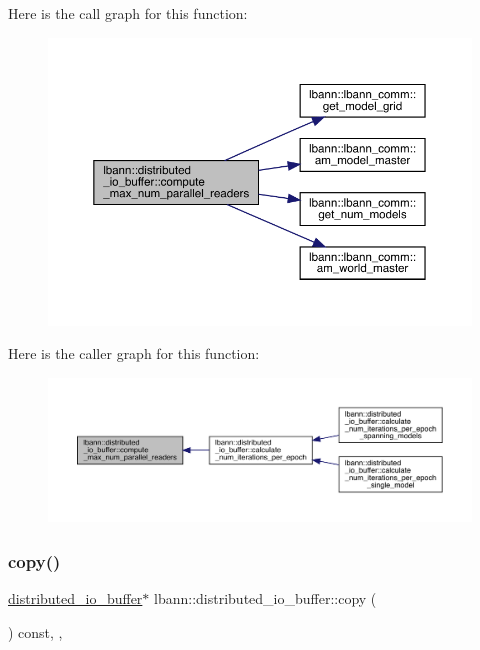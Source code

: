 Here is the call graph for this function\+:\nopagebreak
\begin{figure}[H]
\begin{center}
\leavevmode
\includegraphics[width=350pt]{classlbann_1_1distributed__io__buffer_af6653723714cf8cf51a928fc9f6e6728_cgraph}
\end{center}
\end{figure}
Here is the caller graph for this function\+:\nopagebreak
\begin{figure}[H]
\begin{center}
\leavevmode
\includegraphics[width=350pt]{classlbann_1_1distributed__io__buffer_af6653723714cf8cf51a928fc9f6e6728_icgraph}
\end{center}
\end{figure}
\mbox{\label{classlbann_1_1distributed__io__buffer_a86a931528aa7a6e178cf6b55bf153881}} 
\subsubsection{\texorpdfstring{copy()}{copy()}}
{\footnotesize\ttfamily \hyperlink{classlbann_1_1distributed__io__buffer}{distributed\+\_\+io\+\_\+buffer}$\ast$ lbann\+::distributed\+\_\+io\+\_\+buffer\+::copy (\begin{DoxyParamCaption}{ }\end{DoxyParamCaption}) const\hspace{0.3cm}{\ttfamily [inline]}, {\ttfamily [override]}, {\ttfamily [virtual]}}




